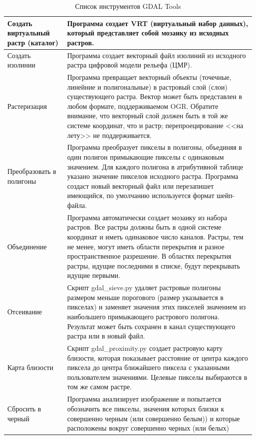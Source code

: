 {\setlength{\extrarowheight}{15pt}
\begin{longtable}{|p{3cm}|p{13cm}|}
\caption{Список инструментов GDAL Tools}\label{tab:gdaltools} \\
\hline Создать виртуальный растр (каталог) & Программа создает VRT
 (виртуальный набор данных), который представляет собой мозаику из исходных растров. \\
\hline Создать изолинии & Программа создает векторный файл изолиний из
 исходного растра цифровой модели рельефа (ЦМР).\\
\hline Растеризация &  Программа превращает векторный объекты (точечные,
 линейние и полигональные) в растровый слой (слои) существующего растра.
 Вектор может быть представлен в любом формате, поддерживаемом OGR. Обратите
 внимание, что векторный слой должен быть в той же системе координат, что и
 растр; перепроецирование <<на лету>> не поддерживается.\\
\hline Преобразовать в полигоны & Программа преобразует пикселы в полигоны,
 объединяя в один полигон примыкающие пикселы с одинаковым значением. Для
 каждого полигона в атрибутивной таблице указано значение пикселов исходного
 растра. Программа создаст новый векторный файл или перезапишет имеющийся,
 по умолчанию используется формат шейп-файла.\\
\hline Объединение &  Программа автоматически создает мозаику из набора растров.
 Все растры должны быть в одной системе координат и иметь одинаковое
 число каналов. Растры, тем не менее, могут иметь области перекрытия и разное
 пространственное разрешение. В областях перекрытия растры, идущие последними в
 списке, будут перекрывать идущие первыми. \\
\hline Отсеивание & Скрипт gdal\_sieve.py удаляет растровые полигоны размером
 меньше порогового (размер указывается в пикселах) и заменяет значения этих
 пикселей значением из наибольшего примыкающего растрового полигона. Результат
 может быть сохранен в канал существующего растра или в новый файл.\\
\hline Карта близости & Скрипт gdal\_proximity.py создает растровую карту
 близости, которая показывает расстояние от центра каждого пиксела до центра
 ближайшего пиксела с указанными пользователем значениями. Целевые пикселы
 выбираются в том же самом растре.\\
\hline Сбросить в черный & Программа анализирует изображение и попытается
 обозначить все пикселы, значения которых близки к совершенно черным (или
 совершенно белым)) и которые расположены вокруг совершенно черных (или белых)

\end{longtable}}
